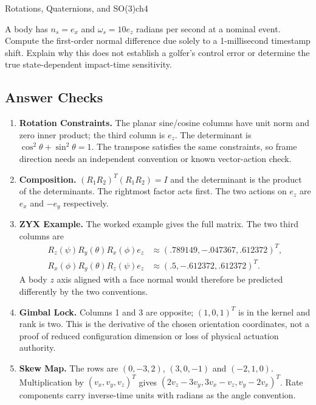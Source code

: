 \begin{exercises}{Rotations, Quaternions, and SO(3)}{ch4}
\begin{exercise}
\label{ex:rotation_timing}
A body has $n_s=e_x$ and $\omega_s=10e_z$ radians per second at a nominal event. Compute the first-order normal difference due solely to a 1-millisecond timestamp shift. Explain why this does not establish a golfer's control error or determine the true state-dependent impact-time sensitivity.
\end{exercise}

\end{exercises}
\endgroup

\subsection{Answer Checks}

\begin{enumerate}
\item \textbf{Rotation Constraints.} The planar sine/cosine columns have unit norm and zero inner product; the third column is $e_z$. The determinant is $\cos^2\theta+\sin^2\theta=1$. The transpose satisfies the same constraints, so frame direction needs an independent convention or known vector-action check.
\item \textbf{Composition.} $(R_1R_2)^T(R_1R_2)=I$ and the determinant is the product of the determinants. The rightmost factor acts first. The two actions on $e_z$ are $e_x$ and $-e_y$ respectively.
\item \textbf{ZYX Example.} The worked example gives the full matrix. The two third columns are
\begin{equation}
\begin{aligned}
R_z(\psi)R_y(\theta)R_x(\phi)e_z&\approx(.789149,-.047367,.612372)^T,\\
R_x(\phi)R_y(\theta)R_z(\psi)e_z&\approx(.5,-.612372,.612372)^T.
\end{aligned}
\end{equation}
A body $z$ axis aligned with a face normal would therefore be predicted differently by the two conventions.
\item \textbf{Gimbal Lock.} Columns 1 and 3 are opposite; $(1,0,1)^T$ is in the kernel and rank is two. This is the derivative of the chosen orientation coordinates, not a proof of reduced configuration dimension or loss of physical actuation authority.
\item \textbf{Skew Map.} The rows are $(0,-3,2)$, $(3,0,-1)$ and $(-2,1,0)$. Multiplication by $(v_x,v_y,v_z)^T$ gives $(2v_z-3v_y,3v_x-v_z,v_y-2v_x)^T$. Rate components carry inverse-time units with radians as the angle convention.

\end{enumerate}
